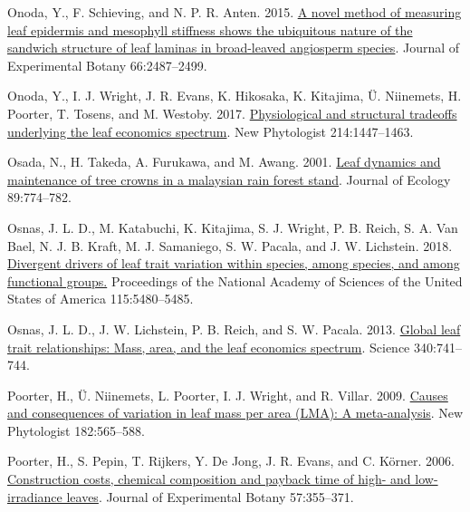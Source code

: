 \documentclass[
  12pt,
]{article}
\newlength{\cslhangindent}
\newlength{\cslentryspacingunit} %
\newenvironment{CSLReferences}[2] %
 {%
  \setlength{\parindent}{0pt}
  \ifodd #1
  \let\oldpar\par
  \def\par{\hangindent=\cslhangindent\oldpar}
  \fi
  \setlength{\parskip}{#2\cslentryspacingunit}
 }%
 {}
\begin{document}
\begin{CSLReferences}{1}{0}
\leavevmode{}%
Onoda, Y., F. Schieving, and N. P. R. Anten. 2015. \href{https://doi.org/10.1093/jxb/erv024}{A novel method of measuring leaf epidermis and mesophyll stiffness shows the ubiquitous nature of the sandwich structure of leaf laminas in broad-leaved angiosperm species}. Journal of Experimental Botany 66:2487--2499.

\leavevmode{}%
Onoda, Y., I. J. Wright, J. R. Evans, K. Hikosaka, K. Kitajima, Ü. Niinemets, H. Poorter, T. Tosens, and M. Westoby. 2017. \href{https://doi.org/10.1111/nph.14496}{Physiological and structural tradeoffs underlying the leaf economics spectrum}. New Phytologist 214:1447--1463.

\leavevmode{}%
Osada, N., H. Takeda, A. Furukawa, and M. Awang. 2001. \href{https://doi.org/10.1046/j.0022-0477.2001.00590.x}{Leaf dynamics and maintenance of tree crowns in a malaysian rain forest stand}. Journal of Ecology 89:774--782.

\leavevmode{}%
Osnas, J. L. D., M. Katabuchi, K. Kitajima, S. J. Wright, P. B. Reich, S. A. Van Bael, N. J. B. Kraft, M. J. Samaniego, S. W. Pacala, and J. W. Lichstein. 2018. \href{https://doi.org/10.1073/pnas.1803989115}{Divergent drivers of leaf trait variation within species, among species, and among functional groups.} Proceedings of the National Academy of Sciences of the United States of America 115:5480--5485.

\leavevmode{}%
Osnas, J. L. D., J. W. Lichstein, P. B. Reich, and S. W. Pacala. 2013. \href{https://doi.org/10.1126/science.1231574}{Global leaf trait relationships: Mass, area, and the leaf economics spectrum}. Science 340:741--744.

\leavevmode{}%
Poorter, H., Ü. Niinemets, L. Poorter, I. J. Wright, and R. Villar. 2009. \href{https://doi.org/10.1111/j.1469-8137.2009.02830.x}{Causes and consequences of variation in leaf mass per area ({LMA}): A meta-analysis}. New Phytologist 182:565--588.

\leavevmode{}%
Poorter, H., S. Pepin, T. Rijkers, Y. De Jong, J. R. Evans, and C. Körner. 2006. \href{https://doi.org/10.1093/jxb/erj002}{Construction costs, chemical composition and payback time of high- and low-irradiance leaves}. Journal of Experimental Botany 57:355--371.


\end{CSLReferences}
\end{document}
